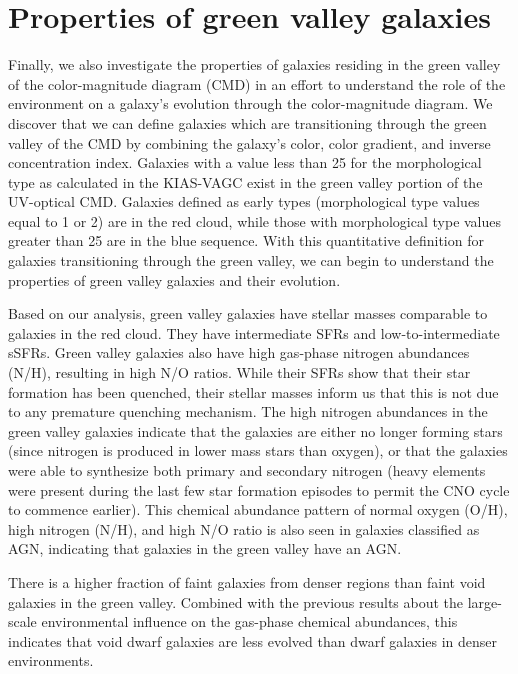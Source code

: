 \section[GV galaxies]{Properties of green valley galaxies}
Finally, we also investigate the properties of galaxies residing in the green 
valley of the color-magnitude diagram (CMD) in an effort to understand the role 
of the environment on a galaxy's evolution through the color-magnitude diagram.  
We discover that we can define galaxies which are transitioning through the 
green valley of the CMD by combining the galaxy's color, color gradient, and 
inverse concentration index.  Galaxies with a value less than 25 for the 
morphological type as calculated in the KIAS-VAGC exist in the green valley 
portion of the UV-optical CMD.  Galaxies defined as early types (morphological 
type values equal to 1 or 2) are in the red cloud, while those with 
morphological type values greater than 25 are in the blue sequence.  With this 
quantitative definition for galaxies transitioning through the green valley, we 
can begin to understand the properties of green valley galaxies and their 
evolution.

Based on our analysis, green valley galaxies have stellar masses comparable to 
galaxies in the red cloud.  They have intermediate SFRs and low-to-intermediate 
sSFRs.  Green valley galaxies also have high gas-phase nitrogen abundances 
(N/H), resulting in high N/O ratios.  While their SFRs show that their star 
formation has been quenched, their stellar masses inform us that this is not due 
to any premature quenching mechanism.  The high nitrogen abundances in the green 
valley galaxies indicate that the galaxies are either no longer forming stars 
(since nitrogen is produced in lower mass stars than oxygen), or that the 
galaxies were able to synthesize both primary and secondary nitrogen (heavy 
elements were present during the last few star formation episodes to permit the 
CNO cycle to commence earlier).  This chemical abundance pattern of normal 
oxygen (O/H), high nitrogen (N/H), and high N/O ratio is also seen in galaxies 
classified as AGN, indicating that galaxies in the green valley have an AGN.

There is a higher fraction of faint galaxies from denser regions than faint void 
galaxies in the green valley.  Combined with the previous results about the 
large-scale environmental influence on the gas-phase chemical abundances, this 
indicates that void dwarf galaxies are less evolved than dwarf galaxies in 
denser environments.


